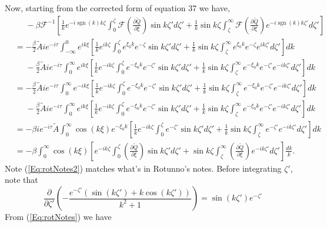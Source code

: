 \documentclass[12pt]{article}
\DeclareMathOperator{\sgn}{sgn}
\begin{document}
Now, starting from the corrected form of equation 37 we have,
\begin{align}
&\phantom{=} -\beta \mathcal{F}^{-1}\left[ \frac{1}{k}e^{-i\sgn(k) k \zeta} \int_0^\zeta \mathcal{F}\left(\frac{\partial \tilde{Q}}{\partial \xi}\right) \sin k\zeta' d\zeta' + \frac{1}{k}\sin k \zeta \int_\zeta^\infty \mathcal{F}\left(\frac{\partial \tilde{Q}}{\partial \xi}\right) e^{-i\sgn(k)k\zeta'} d\zeta' \right]
\label{Eq:start} \\
&=-\frac{\beta}{2} \tilde{A} i e^{-i\tau} \int_{-\infty}^{0} e^{ik\xi} \left[\frac{1}{k}e^{i k \zeta} \int_0^\zeta  e^{\xi_0 k} e^{-\zeta} \sin k\zeta' d\zeta' + \frac{1}{k}\sin k \zeta \int_\zeta^\infty  e^{\xi_0 k} e^{-\zeta} e^{ik\zeta'} d\zeta' \right] dk \\
&\phantom{=} -\frac{\beta}{2} \tilde{A} i e^{-i\tau} \int_{0}^{\infty} e^{ik\xi} \left[\frac{1}{k}e^{-i k \zeta} \int_0^\zeta  e^{-\xi_0 k} e^{-\zeta'} \sin k\zeta' d\zeta' + \frac{1}{k}\sin k \zeta \int_\zeta^\infty  e^{-\xi_0 k} e^{-\zeta'} e^{-i k\zeta'} d\zeta' \right] dk \\
&= -\frac{\beta}{2} \tilde{A} i e^{-i\tau} \int_{0}^{\infty} e^{-ik\xi} \left[\frac{1}{k}e^{-i k \zeta} \int_0^\zeta  e^{-\xi_0 k} e^{-\zeta'} \sin k\zeta' d\zeta' + \frac{1}{k}\sin k \zeta \int_\zeta^\infty  e^{-\xi_0 k} e^{-\zeta'} e^{-ik\zeta'} d\zeta' \right] dk \\
&\phantom{=} -\frac{\beta}{2} \tilde{A} i e^{-i\tau} \int_{0}^{\infty} e^{ik\xi} \left[\frac{1}{k}e^{-i k \zeta} \int_0^\zeta  e^{-\xi_0 k} e^{-\zeta'} \sin k\zeta' d\zeta' + \frac{1}{k}\sin k \zeta \int_\zeta^\infty e^{-\xi_0 k} e^{-\zeta'} e^{-i k\zeta'} d\zeta' \right] dk \\
&=-\beta i e^{-i\tau} \tilde{A} \int_{0}^{\infty} \cos\left(k\xi \right) e^{-\xi_0 k} \left[\frac{1}{k}e^{-i k \zeta} \int_0^\zeta e^{-\zeta'}  \sin k\zeta' d\zeta' + \frac{1}{k}\sin k \zeta \int_\zeta^\infty e^{-\zeta'} e^{-ik\zeta'} d\zeta' \right] dk \label{Eq:rotNotes} \\ 
&=-\beta \int_{0}^{\infty} \cos\left(k\xi \right) \left[e^{-i k \zeta} \int_0^\zeta \left(\frac{\partial \tilde{Q}}{\partial \xi}\right) \sin k\zeta' d\zeta' + \sin k \zeta \int_\zeta^\infty \left(\frac{\partial \tilde{Q}}{\partial \xi}\right) e^{-ik\zeta'} d\zeta' \right] \frac{dk}{k}. \label{Eq:rotNotes2}
\end{align}
Note (\ref{Eq:rotNotes2}) matches what's in Rotunno's notes. Before integrating $\zeta'$, note that 
\begin{equation}
\frac{\partial}{\partial \zeta'} \left(-\frac{e^{-\zeta'}\left(\sin(k\zeta')+k\cos(k \zeta')\right) }{k^2+1} \right) = \sin(k\zeta')e^{-\zeta'}
\end{equation} From (\ref{Eq:rotNotes}) we have
\end{document}
